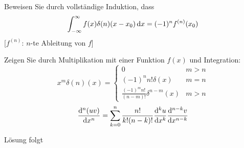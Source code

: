 \documentclass{atistandalonetask}
\begin{document}
  \begin{atiTask}[
    title = Die Ableitung der Delta-Distribution
  ]
    \begin{atiSubtasks}
    	\item Beweisen Sie durch vollständige Induktion, dass
    	\[
    	\int_{-\infty}^{\infty} f(x)\delta{(n)(x-x_0)}\,\mathrm{d} x=(-1)^nf^{(n)}(x_0)
    	\]
    	[$f^{(n)}$: $n$-te Ableitung von $f$]
    	\item Zeigen Sie durch Multiplikation mit einer Funktion $f(x)$ und Integration:
    	\[
    	x^m\delta{(n)}(x)=\begin{cases}
    	0 & m>n\\
    	(-1)^n n!\delta(x)& m=n\\
    	\frac{(-1)^m n!}{(n-m)!}\delta^{n-m}(x) & m>n
    	\end{cases}
    	\]
		\[
		\leibnizDerivative[n]{(uv)}{x}=\sum _{k=0}^n \frac{n!}{k! (n-k)!}\leibnizDerivative[k]{u}{x}\leibnizDerivative[n-k]{v}{x}
		\]
    \end{atiSubtasks}	
  \end{atiTask}
  \begin{atiSolution}
  	Lösung folgt
%  
  \end{atiSolution}
\end{document}
